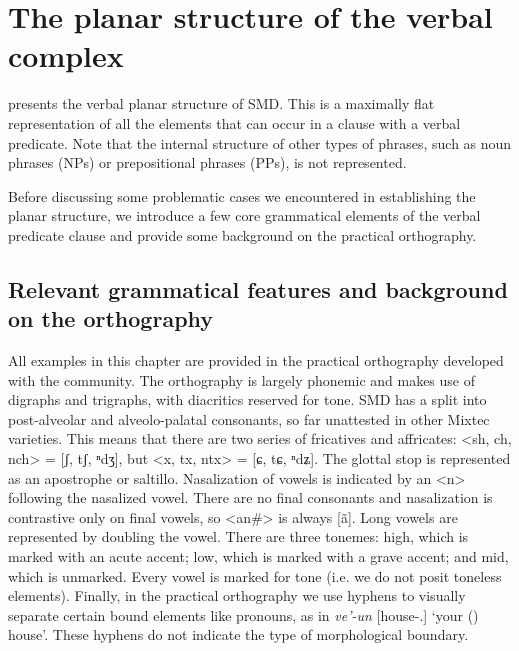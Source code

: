 \documentclass[output=paper]{langscibook}
\begin{document}
\section{The planar structure of the verbal complex} %
\label{sec:planarstructures}

 presents the verbal planar structure of SMD. This is a maximally flat representation of all the elements that can occur in a clause with a verbal predicate. Note that the internal structure of other types of phrases, such as noun phrases (NPs) or prepositional phrases (PPs), is not represented.

Before discussing some problematic cases we encountered in establishing the planar structure, we introduce a few core grammatical elements of the verbal predicate clause and provide some background on the practical orthography. 


\subsection{Relevant grammatical features and background on the orthography}
\label{sec:gramfacts}


All examples in this chapter are provided in the practical orthography developed with the community. 
The orthography is largely phonemic and makes use of digraphs and trigraphs, with diacritics reserved for tone.
SMD has a split into post-alveolar and alveolo-palatal consonants, so far unattested in other Mixtec varieties. This means that there are two series of fricatives and affricates: \textless{}sh, ch, nch\textgreater{} = [ʃ, tʃ, ⁿdʒ], but \textless{}x, tx, ntx\textgreater{} = [ɕ, tɕ, ⁿdʑ].
The glottal stop is represented as an apostrophe or saltillo.
Nasalization of vowels is indicated by an \textless{}n\textgreater{}{} following the nasalized vowel. There are no final consonants and nasalization is contrastive only on final vowels, so \textless{}an\#\textgreater{} is always [ã]. Long vowels are represented by doubling the vowel.
There are three tonemes: high, which is marked with an acute accent; low, which is marked with a grave accent; and mid, which is unmarked. Every vowel is marked for tone (i.e. we do not posit toneless elements).
Finally, in the practical orthography we use hyphens to visually separate certain bound elements like pronouns, as in \textit{ve'-un} [house-\Ssg.\Nhon{}] `your (\Sg) house'. These hyphens do not indicate the type of morphological boundary.
\end{document}
